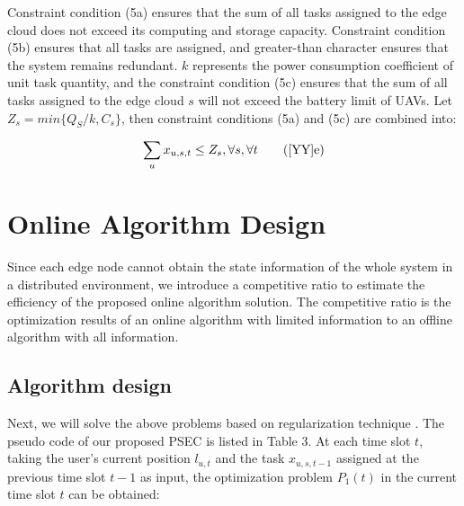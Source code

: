 \documentclass[journal,article,submit,pdftex,moreauthors]{Definitions/mdpi}
\begin{document}
Constraint condition (5a) ensures that the sum of all tasks assigned to the edge cloud does not exceed its computing and storage capacity. Constraint condition (5b) ensures that all tasks are assigned, and greater-than character ensures that the system remains redundant.  $k$ represents the power consumption coefficient of unit task quantity, and the constraint condition (5c) ensures that the sum of all tasks assigned to the edge cloud $s$ will not exceed the battery limit of UAVs. Let $Z_s=min\{Q_S /k,C_s\}$, then constraint conditions (5a) and (5c) are combined into:

\begin{align}
\sum_u x_{u,s,t}\le Z_s, \forall s ,\forall t  \tag{\ref{YY}{e}} \label{YYe}
\end{align}
\section{Online Algorithm Design}
Since each edge node cannot obtain the state information of the whole system in a distributed environment, we introduce a competitive ratio to estimate the efficiency of the proposed online algorithm solution. The competitive ratio is the optimization results of an online algorithm with limited information to an offline algorithm with all information.
\subsection{Algorithm design}
Next, we will solve the above problems based on regularization technique \cite{ZHANG K Y,WANG}. The pseudo code of our proposed PSEC is listed in Table 3. At each time slot $t$, taking the user's current position $l_{u,t}$ and the task $x_{u,s,t-1}$ assigned at the previous time slot $t-1$ as input, the optimization problem $P_1(t)$ in the current time slot $t$ can be obtained:
\end{document}
